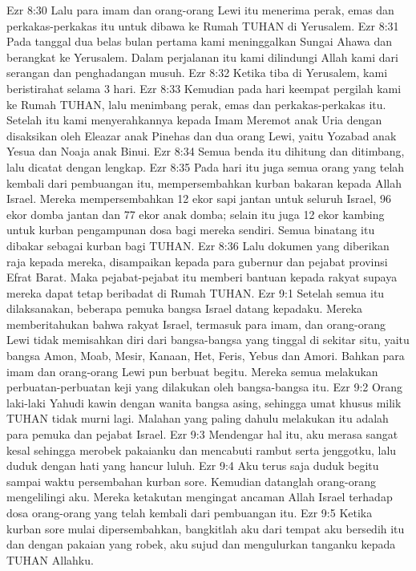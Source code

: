 Ezr 8:30  Lalu para imam dan orang-orang Lewi itu menerima perak, emas dan perkakas-perkakas itu untuk dibawa ke Rumah TUHAN di Yerusalem.
Ezr 8:31  Pada tanggal dua belas bulan pertama kami meninggalkan Sungai Ahawa dan berangkat ke Yerusalem. Dalam perjalanan itu kami dilindungi Allah kami dari serangan dan penghadangan musuh.
Ezr 8:32  Ketika tiba di Yerusalem, kami beristirahat selama 3 hari.
Ezr 8:33  Kemudian pada hari keempat pergilah kami ke Rumah TUHAN, lalu menimbang perak, emas dan perkakas-perkakas itu. Setelah itu kami menyerahkannya kepada Imam Meremot anak Uria dengan disaksikan oleh Eleazar anak Pinehas dan dua orang Lewi, yaitu Yozabad anak Yesua dan Noaja anak Binui.
Ezr 8:34  Semua benda itu dihitung dan ditimbang, lalu dicatat dengan lengkap.
Ezr 8:35  Pada hari itu juga semua orang yang telah kembali dari pembuangan itu, mempersembahkan kurban bakaran kepada Allah Israel. Mereka mempersembahkan 12 ekor sapi jantan untuk seluruh Israel, 96 ekor domba jantan dan 77 ekor anak domba; selain itu juga 12 ekor kambing untuk kurban pengampunan dosa bagi mereka sendiri. Semua binatang itu dibakar sebagai kurban bagi TUHAN.
Ezr 8:36  Lalu dokumen yang diberikan raja kepada mereka, disampaikan kepada para gubernur dan pejabat provinsi Efrat Barat. Maka pejabat-pejabat itu memberi bantuan kepada rakyat supaya mereka dapat tetap beribadat di Rumah TUHAN.
Ezr 9:1  Setelah semua itu dilaksanakan, beberapa pemuka bangsa Israel datang kepadaku. Mereka memberitahukan bahwa rakyat Israel, termasuk para imam, dan orang-orang Lewi tidak memisahkan diri dari bangsa-bangsa yang tinggal di sekitar situ, yaitu bangsa Amon, Moab, Mesir, Kanaan, Het, Feris, Yebus dan Amori. Bahkan para imam dan orang-orang Lewi pun berbuat begitu. Mereka semua melakukan perbuatan-perbuatan keji yang dilakukan oleh bangsa-bangsa itu.
Ezr 9:2  Orang laki-laki Yahudi kawin dengan wanita bangsa asing, sehingga umat khusus milik TUHAN tidak murni lagi. Malahan yang paling dahulu melakukan itu adalah para pemuka dan pejabat Israel.
Ezr 9:3  Mendengar hal itu, aku merasa sangat kesal sehingga merobek pakaianku dan mencabuti rambut serta jenggotku, lalu duduk dengan hati yang hancur luluh.
Ezr 9:4  Aku terus saja duduk begitu sampai waktu persembahan kurban sore. Kemudian datanglah orang-orang mengelilingi aku. Mereka ketakutan mengingat ancaman Allah Israel terhadap dosa orang-orang yang telah kembali dari pembuangan itu.
Ezr 9:5  Ketika kurban sore mulai dipersembahkan, bangkitlah aku dari tempat aku bersedih itu dan dengan pakaian yang robek, aku sujud dan mengulurkan tanganku kepada TUHAN Allahku.

